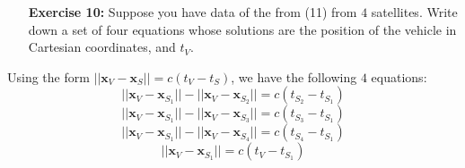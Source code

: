 \documentclass[11pt]{article}
\theoremstyle{definition}
\newcommand{\1}[1]{\mathbf{1} \left \{ #1 \right \}}
\begin{document}
\begin{itemize}
\item[{\textbf{Exercise 10:}}] Suppose you have data of the from (11) from $4$ satellites.  Write down a set of four equations whose solutions are the position of the vehicle in Cartesian coordinates, and $t_V$.
\end{itemize}
Using the form \(||\textbf{x}_V - \textbf{x}_S|| = c(t_V - t_S)\), we have the following $4$ equations:
\begin{equation}
    ||\textbf{x}_V - \textbf{x}_{S_1}|| - ||\textbf{x}_V - \textbf{x}_{S_2}|| = c(t_{S_2} - t_{S_1})
\end{equation}
\begin{equation}
    ||\textbf{x}_V - \textbf{x}_{S_1}|| - ||\textbf{x}_V - \textbf{x}_{S_3}|| = c(t_{S_3} - t_{S_1})
\end{equation}
\begin{equation}
    ||\textbf{x}_V - \textbf{x}_{S_1}|| - ||\textbf{x}_V - \textbf{x}_{S_4}|| = c(t_{S_4} - t_{S_1})
\end{equation}
\begin{equation}
    ||\textbf{x}_V - \textbf{x}_{S_1}|| = c(t_V - t_{S_1})
\end{equation}
\end{document}

